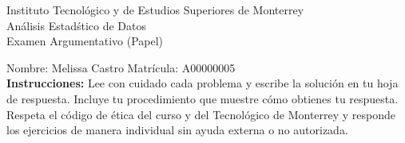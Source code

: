 \documentclass[10pt]{report}
\begin{document}
\newpage



\begin{center}
{\large Instituto Tecnol\'{o}gico y de Estudios Superiores de Monterrey \\
An\'alisis Estad\'stico de Datos } \\
Examen Argumentativo (Papel)
\end{center}

Nombre: \underline{\hspace*{.2in}}
Melissa Castro
\underline{\hspace*{.2in}} \quad Matr\'icula:\underline{\hspace*{.2in}}
A00000005
\underline{\hspace*{.2in}} \\

{\bf Instrucciones:} Lee con cuidado cada problema y escribe la soluci\'on
en tu hoja de respuesta. Incluye tu procedimiento que muestre c\'omo obtienes tu respuesta.  Respeta el c\'odigo de \'etica del curso y del Tecnol\'ogico de Monterrey y responde los ejercicios de manera individual sin ayuda externa o no autorizada.
\end{document}
